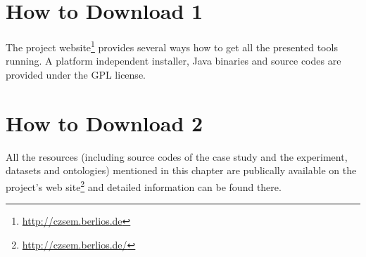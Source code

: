 \section{How to Download 1}
The project website\footnote{\url{http://czsem.berlios.de}} provides several ways how to get all the presented tools running. A platform independent installer, Java binaries and source codes are provided under the GPL license.


\section{How to Download 2}
All the resources (including source codes of the case study and the experiment, datasets and ontologies) mentioned in this chapter are publically available on the project's web site\footnote{\url{http://czsem.berlios.de/}} and detailed information can be found there.
